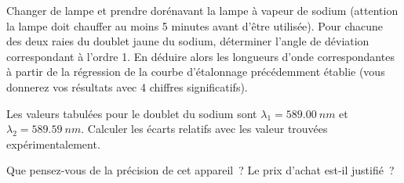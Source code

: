 \documentclass[a4paper, 12pt, final, garamond]{book}
\begin{document}
Changer de lampe et prendre dorénavant la lampe à vapeur de sodium (attention la
lampe doit chauffer au moins 5 minutes avant d'être utilisée). Pour chacune des
deux raies du doublet jaune du sodium, déterminer l'angle de déviation
correspondant à l'ordre 1. En déduire alors les longueurs d'onde correspondantes
à partir de la régression de la courbe d'étalonnage précédemment établie (vous
donnerez vos résultats avec 4 chiffres significatifs). 

\medskip

Les valeurs tabulées pour le doublet du sodium sont $\lambda_1 =
\SI{589,00}{nm}$ et $\lambda_2 = \SI{589,59}{nm}$. Calculer les écarts relatifs
avec les valeur trouvées expérimentalement. 

\medskip

Que pensez-vous de la précision de cet appareil~? Le prix d'achat est-il
justifié~? 
\end{document}

